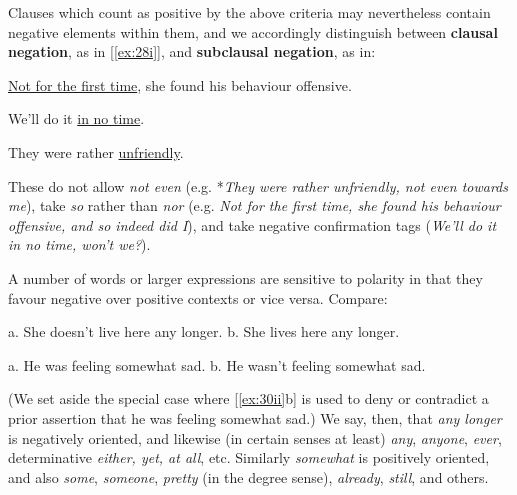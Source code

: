 Clauses which count as positive by the above criteria may nevertheless contain negative elements within them, and we accordingly distinguish between \textbf{clausal negation}, as in [\ref{ex:28i}], and \textbf{subclausal negation}, as in:
\begin{examples}
\item \label{ex:29}
    \begin{examples}
        \item \uline{Not for the first time}, she found his behaviour offensive.
        \item We'll do it \uline{in no time}.
        \item They were rather \uline{unfriendly}.
    \end{examples}
\end{examples}
These do not allow \textit{not even} (e.g. *\textit{They were rather unfriendly, not even towards me}), take \textit{so} rather than \textit{nor} (e.g. \textit{Not for the first time, she found his behaviour offensive, and so indeed did I}), and take negative confirmation tags (\textit{We'll do it in no time, won't we?}).

A number of words or larger expressions are sensitive to polarity in that they favour negative over positive contexts or vice versa. Compare:
\begin{examples}
\item \label{ex:30}
    \begin{examples}
        \item \label{ex:30i}
            \textnormal{a.} She doesn't live here any longer.\hspace{3em}
            \textnormal{b.} \ungram She lives here any longer.
        \item \label{ex:30ii}
            \textnormal{a.} He was feeling somewhat sad.\hspace{4.2em}
            \textnormal{b.} \ungram He wasn't feeling somewhat sad.
    \end{examples}
\end{examples}

(We set aside the special case where [\ref{ex:30ii}b] is used to deny or contradict a prior assertion that he was feeling somewhat sad.) We say, then, that \textit{any longer} is {negatively oriented}, and likewise (in certain senses at least) \textit{any}, \textit{anyone}, \textit{ever}, determinative \textit{either, yet, at all}, etc. Similarly \textit{somewhat} is {positively oriented}, and also \textit{some}, \textit{someone}, \textit{pretty} (in the degree sense), \textit{already}, \textit{still}, and others.


